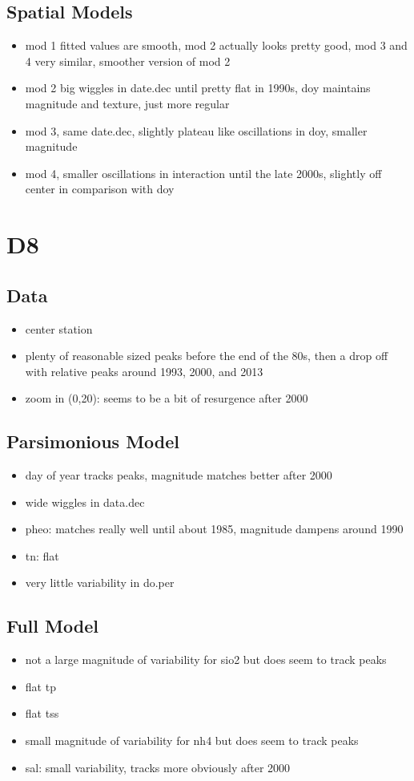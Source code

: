 \documentclass[12pt]{amsart}
\begin{document}
\subsection{Spatial Models}

\begin{itemize}
\item mod 1 fitted values are smooth, mod 2 actually looks pretty good, mod 3 and 4 very similar, smoother version of mod 2
\item mod 2 big wiggles in date.dec until pretty flat in 1990s, doy maintains magnitude and texture, just more regular
\item mod 3, same date.dec,  slightly plateau like oscillations in doy, smaller magnitude
\item mod 4, smaller oscillations in interaction until the late 2000s, slightly off center in comparison with doy
\end{itemize}



\section{D8}
\subsection{Data}
\begin{itemize}
\item center station
\item plenty of reasonable sized peaks before the end of the 80s, then a drop off with relative peaks around 1993, 2000, and 2013
\item zoom in (0,20): seems to be a bit of resurgence after 2000
\end{itemize}
\subsection{Parsimonious Model}
\begin{itemize}
\item day of year tracks peaks, magnitude matches better after 2000
\item wide wiggles in data.dec
\item pheo:  matches really well until about 1985, magnitude dampens around 1990
\item tn: flat
\item very little variability in do.per
\end{itemize}
\subsection{Full Model}
\begin{itemize}
\item not a large magnitude of variability for sio2 but does seem to track peaks
\item flat tp
\item flat tss
\item small magnitude of variability for nh4 but does seem to track peaks
\item sal: small variability, tracks more obviously after 2000
\end{itemize}
\end{document}
